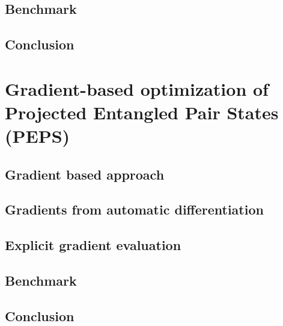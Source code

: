\documentclass[12pt,a4paper]{book}
\begin{document}
\section{Benchmark}
\label{sec:truncation:benchmark}


\section{Conclusion}
\label{sec:truncation:conclusion}


\chapter[Gradient-based optimization of PEPS]{Gradient-based optimization of Projected Entangled Pair States (PEPS)}
\label{ch:gradpeps}


\section{Gradient based approach}
\label{sec:gradpeps:grad_based}


\section{Gradients from automatic differentiation}
\label{sec:gradpeps:autodiff}


\section{Explicit gradient evaluation}
\label{sec:gradpeps:approx}


\section{Benchmark}
\label{sec:gradpeps:benchmark}


\section{Conclusion}
\label{sec:gradpeps:conclusion}

\end{document}
